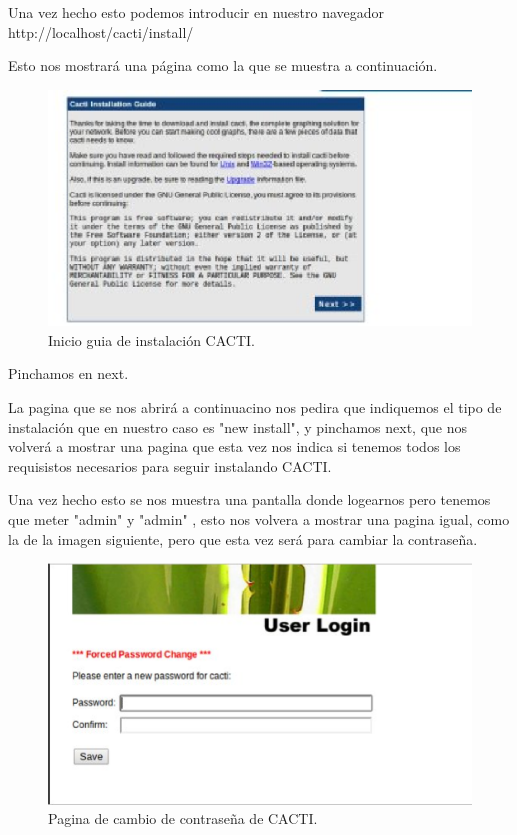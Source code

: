 Una vez hecho esto podemos introducir en nuestro navegador http://localhost/cacti/install/ 

Esto nos mostrará una página como la que se muestra a continuación.

\begin{figure}[H]
\begin{center}
\includegraphics[scale=0.5]{imagenes/opcional5-3.eps}
\caption{Inicio guia de instalación CACTI.}
\end{center}
\end{figure}

Pinchamos en next.

La pagina que se nos abrirá a continuacino nos pedira que indiquemos el tipo de instalación que en nuestro caso es "new install", y pinchamos next, que nos volverá a mostrar una pagina que esta vez nos indica si tenemos todos los requisistos necesarios para seguir instalando CACTI.

Una vez hecho esto se nos muestra una pantalla donde logearnos pero tenemos que meter "admin" y "admin" , esto nos volvera a mostrar una pagina igual, como la de la imagen siguiente, pero que esta vez será para cambiar la contraseña.


\begin{figure}[H]
\begin{center}
\includegraphics[scale=0.4]{imagenes/opcional5-4.eps}
\caption{Pagina de cambio de contraseña de CACTI.}
\end{center}
\end{figure}


